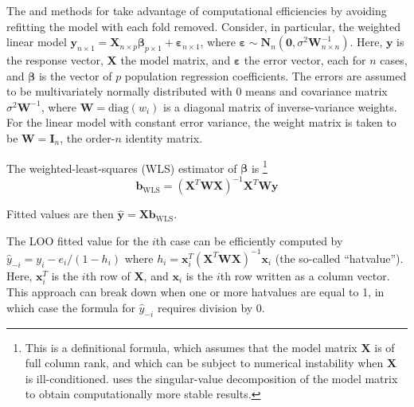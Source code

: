 \documentclass[
]{jss}
\begin{document}
The  and  methods for  take advantage
of computational efficiencies by avoiding refitting the model with each
fold removed. Consider, in particular, the weighted linear model
\(\mathbf{y}_{n \times 1} = \mathbf{X}_{n \times p}\boldsymbol{\beta}_{p \times 1} + \boldsymbol{\varepsilon}_{n \times 1}\),
where
\(\boldsymbol{\varepsilon} \sim \mathbf{N}_n \left(\mathbf{0}, \sigma^2 \mathbf{W}^{-1}_{n \times n}\right)\).
Here, \(\mathbf{y}\) is the response vector, \(\mathbf{X}\) the model
matrix, and \(\boldsymbol{\varepsilon}\) the error vector, each for
\(n\) cases, and \(\boldsymbol{\beta}\) is the vector of \(p\)
population regression coefficients. The errors are assumed to be
multivariately normally distributed with 0 means and covariance matrix
\(\sigma^2 \mathbf{W}^{-1}\), where \(\mathbf{W} = \mathrm{diag}(w_i)\)
is a diagonal matrix of inverse-variance weights. For the linear model
with constant error variance, the weight matrix is taken to be
\(\mathbf{W} = \mathbf{I}_n\), the order-\(n\) identity matrix.

The weighted-least-squares (WLS) estimator of \(\boldsymbol{\beta}\) is
\citep[see, e.g.,][Sec. 12.2.2]{Fox:2016} \footnote{This is a
  definitional formula, which assumes that the model matrix
  \(\mathbf{X}\) is of full column rank, and which can be subject to
  numerical instability when \(\mathbf{X}\) is ill-conditioned.
   uses the singular-value decomposition of the model matrix
  to obtain computationally more stable results.} \[
\mathbf{b}_{\mathrm{WLS}} = \left( \mathbf{X}^T \mathbf{W} \mathbf{X} \right)^{-1} 
  \mathbf{X}^T \mathbf{W} \mathbf{y}
\]

Fitted values are then
\(\widehat{\mathbf{y}} = \mathbf{X}\mathbf{b}_{\mathrm{WLS}}\).

The LOO fitted value for the \(i\)th case can be efficiently computed by
\(\widehat{y}_{-i} = y_i - e_i/(1 - h_i)\) where
\(h_i = \mathbf{x}^T_i \left( \mathbf{X}^T \mathbf{W} \mathbf{X} \right)^{-1} \mathbf{x}_i\)
(the so-called ``hatvalue''). Here, \(\mathbf{x}^T_i\) is the \(i\)th
row of \(\mathbf{X}\), and \(\mathbf{x}_i\) is the \(i\)th row written
as a column vector. This approach can break down when one or more
hatvalues are equal to 1, in which case the formula for
\(\widehat{y}_{-i}\) requires division by 0.
\end{document}
